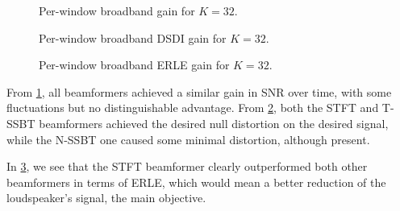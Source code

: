 
\begin{figure}[H]
	\centering
	
	\caption{Per-window broadband gain for $K = 32$.}
	\label{fig:lineplot_gain_32}
\end{figure}
\begin{figure}[H]
	\centering
	
	\caption{Per-window broadband DSDI gain for $K = 32$.}
	\label{fig:lineplot_dsdi_32}
\end{figure}
\begin{figure}[H]
	\centering
	
	\caption{Per-window broadband ERLE gain for $K = 32$.}
	\label{fig:lineplot_erle_32}
\end{figure}

From \cref{fig:lineplot_gain_32}, all beamformers achieved a similar gain in SNR over time, with some fluctuations but no distinguishable advantage. From \cref{fig:lineplot_dsdi_32}, both the STFT and T-SSBT beamformers achieved the desired null distortion on the desired signal, while the N-SSBT one caused some minimal distortion, although present.

In \cref{fig:lineplot_erle_32}, we see that the STFT beamformer clearly outperformed both other beamformers in terms of ERLE, which would mean a better reduction of the loudspeaker's signal, the main objective.


